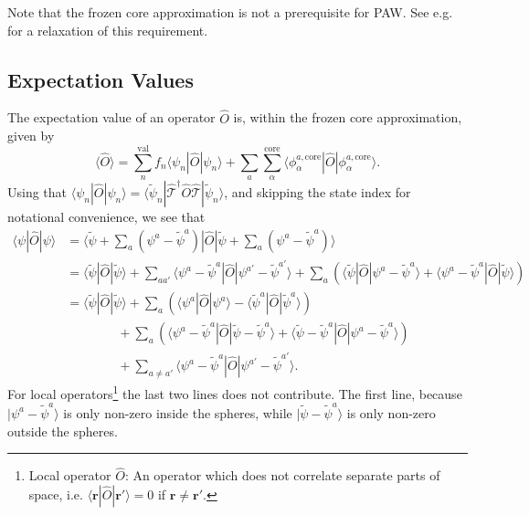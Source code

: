 \documentclass[a4paper]{article}
\newcommand{\s}[1]{\tilde{#1}}
\newcommand{\wh}[1]{\widehat{#1}}
\newcommand{\br}{\mathbf{r}}
\newcommand{\T}{\hat{\mathcal{T}}}
\newcommand{\bra}[1]{\langle #1 |}
\newcommand{\ket}[1]{| #1 \rangle}
\begin{document}
Note that the frozen core approximation is not a prerequisite for PAW.
See e.g. \cite{Marsman2006} for a relaxation of this requirement.

\subsection{Expectation Values}\label{sec: expectation values}

The expectation value of an operator $\wh{O}$ is, within the frozen
core approximation, given by
%
\begin{equation}
  \langle \wh{O} \rangle = \sum_n^\text{val} f_n \bra{\psi_n}\wh{O}\ket{\psi_n} + \sum_a \sum_\alpha^\text{core} \bra{\phi_\alpha^{a,\text{core}}}\wh{O}\ket{\phi_\alpha^{a,\text{core}}}.
\end{equation}
%
Using that $\bra{\psi_n}\wh{O}\ket{\psi_n} =
\bra{\s{\psi}_n}\T^\dagger \wh{O}\T\ket{\s{\psi}_n}$, and skipping the
state index for notational convenience, we see that
%
\begin{equation}
  \begin{split}
    \bra{\psi}\wh{O}\ket{\psi} &= \bra{\s{\psi} + \sum_a(\psi^a - \s{\psi}^a)} \wh{O} \ket {\s{\psi} + \sum_a(\psi^a - \s{\psi}^a)}\\
&= \bra{\s{\psi}}\wh{O}\ket{\s{\psi}} + \sum_{aa'} \bra{\psi^a - \s{\psi}^a}\wh{O}\ket{\psi^{a'} - \s{\psi}^{a'}} + \sum_a \left(\bra{\s{\psi}}\wh{O}\ket{\psi^a - \s{\psi}^a} + \bra{\psi^a - \s{\psi}^a}\wh{O}\ket{\s{\psi}}\right)\\
&= \bra{\s{\psi}}\wh{O}\ket{\s{\psi}} + \sum_{a}\left( \bra{\psi^a}\wh{O}\ket{\psi^a} - \bra{\s{\psi}^a}\wh{O}\ket{\s{\psi}^a} \right)\\
& \hspace{48pt}+ \sum_a \left( \bra{\psi^a - \s{\psi}^a}\wh{O}\ket{\s{\psi} - \s{\psi}^a} + \bra{\s{\psi} - \s{\psi}^a}\wh{O}\ket{\psi^a - \s{\psi}^a} \right)\\
& \hspace{48pt}+ \sum_{a\neq a'} \bra{\psi^a - \s{\psi}^a}\wh{O}\ket{\psi^{a'} - \s{\psi}^{a'}}.
  \end{split}
\end{equation}
%
For local operators\footnote{Local operator $\wh{O}$: An operator
  which does not correlate separate parts of space, i.e.
  $\bra{\br}\wh{O}\ket{\br'} = 0$ if $\br\neq \br'$.} the last two
lines does not contribute. The first line, because $\ket{\psi^a -
  \s{\psi}^a}$ is only non-zero inside the spheres, while
$\ket{\s{\psi} - \s{\psi}^a}$ is only non-zero outside the spheres.
\end{document}
